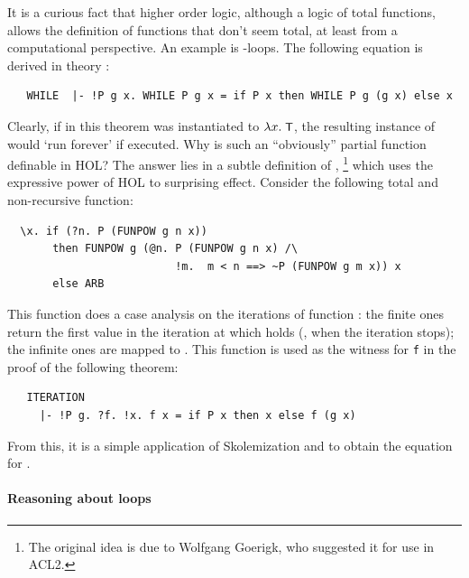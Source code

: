 It is a curious fact that higher order logic, although a logic of
total functions, allows the definition of functions that don't
seem total, at least from a computational perspective. An example
is -loops. The following equation is derived in theory
:
%
\begin{hol}
\begin{verbatim}
   WHILE  |- !P g x. WHILE P g x = if P x then WHILE P g (g x) else x
\end{verbatim}
\end{hol}
%
Clearly, if  in this theorem was instantiated to $\lambda
x.\;\mbox{\small{\textbf{\sf{T}}}}$, the resulting instance of  would `run
forever' if executed. Why is such an ``obviously'' partial function
definable in HOL?
%
The answer lies in a subtle definition of ,
\footnote{The original idea is due to Wolfgang Goerigk,
          who suggested it for use in ACL2.}
which uses the expressive power of HOL to surprising effect. Consider
the following total and non-recursive function:
%
\begin{hol}
\begin{verbatim}
  \x. if (?n. P (FUNPOW g n x))
       then FUNPOW g (@n. P (FUNPOW g n x) /\
                          !m.  m < n ==> ~P (FUNPOW g m x)) x
       else ARB
\end{verbatim}
\end{hol}
%
This function does a case analysis on the iterations of function
\holtxt{g}: the finite ones return the first value in the iteration at
which \holtxt{P} holds (\ie, when the iteration stops); the infinite
ones are mapped to \holtxt{ARB}. This function is used as the witness
for \verb+f+ in the proof of the following theorem:
%
\begin{hol}
\begin{verbatim}
   ITERATION
     |- !P g. ?f. !x. f x = if P x then x else f (g x)
\end{verbatim}
\end{hol}
%
From this, it is a simple application of Skolemization and
 to obtain the equation for .

\paragraph{Reasoning about  loops}

